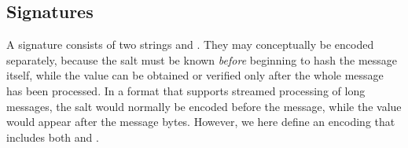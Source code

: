 \begin{algorithm}[!htp]
\caption{$\decompress(\str, \slen)$ \hfill}\label{alg:decompress}
	\begin{algorithmic}[1]
	\If{$|\str| \neq \slen$}\label{line:fix} 
	\Return{$\bot$} \label{line:fix2}
	\EndIf
	\label{line:dbin} 
	\label{line:8}
	\EndWhile
	\label{line:zero} 
	\Return{$\bot$}\label{line:zero2}
	\EndIf
	\EndFor
	\label{line:trail} 
	\Return{$\bot$}\label{line:trail2} 
	\EndIf
	\end{algorithmic}
\end{algorithm}

\subsection{Signatures}

A \falcon signature consists of two strings \salt and \comps. They may
conceptually be encoded separately, because the salt \salt must be known
\emph{before} beginning to hash the message itself, while the \comps
value can be obtained or verified only after the whole message has been
processed. In a format that supports streamed processing of long
messages, the salt \salt would normally be encoded before the message,
while the \comps value would appear after the message bytes. However,
we here define an encoding that includes both \salt and \comps.

